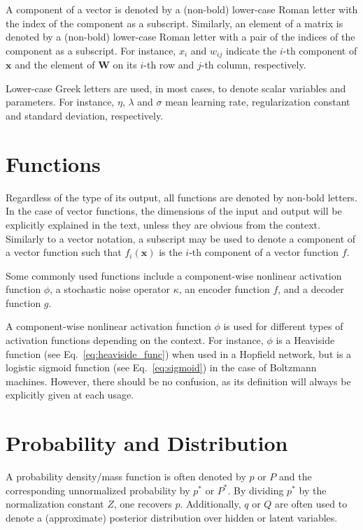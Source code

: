 \documentclass[dissertation,nocontribution,draft*]{aaltoseries}
\newcommand{\vect}[1]{\mathbf{#1}}
\newcommand{\matr}[1]{\mathbf{#1}}
\newcommand{\vx}[0]{\vect{x}}
\newcommand{\mW}[0]{\matr{W}}
\begin{document}
A component of a vector is denoted by a (non-bold)
lower-case Roman letter with the index of the component as a
subscript.  Similarly, an element of a matrix is denoted by
a (non-bold) lower-case Roman letter with a pair of the
indices of the component as a subscript. For instance, $x_i$
and $w_{ij}$ indicate the $i$-th component of $\vx$ and the
element of $\mW$ on its $i$-th row and $j$-th column,
respectively.

Lower-case Greek letters are used, in most cases, to denote
scalar variables and parameters. For instance, $\eta$,
$\lambda$ and $\sigma$ mean learning rate, 
regularization constant and standard deviation,
respectively. 

\section*{Functions}

Regardless of the type of its output, all functions are
denoted by non-bold letters. In the case of vector
functions, the dimensions of the input and output will be
explicitly explained in the text, unless they are obvious
from the context. Similarly to a vector notation, a
subscript may be used to denote a component of a vector
function such that $f_i(\vx)$ is the $i$-th component of a
vector function $f$.

Some commonly used functions include a
component-wise nonlinear activation function $\phi$, a
stochastic noise operator $\kappa$, an encoder function $f$,
and a decoder function $g$.

A component-wise nonlinear activation function $\phi$ is
used for different types of activation functions depending
on the context. For instance, $\phi$ is a Heaviside function
(see Eq.~\eqref{eq:heaviside_func}) when used in a Hopfield
network, but is a logistic sigmoid function (see
Eq.~\eqref{eq:sigmoid}) in the case of Boltzmann machines.
However, there should be no confusion, as its definition
will always be explicitly given at each usage.

\section*{Probability and Distribution}

A probability density/mass function is often denoted by $p$
or $P$ and the corresponding unnormalized probability by
$p^*$ or $P^*$.  By dividing $p^*$ by the normalization
constant $Z$, one recovers $p$. Additionally, $q$ or $Q$ are
often used to denote a (approximate) posterior distribution
over hidden or latent variables. 
\end{document}
